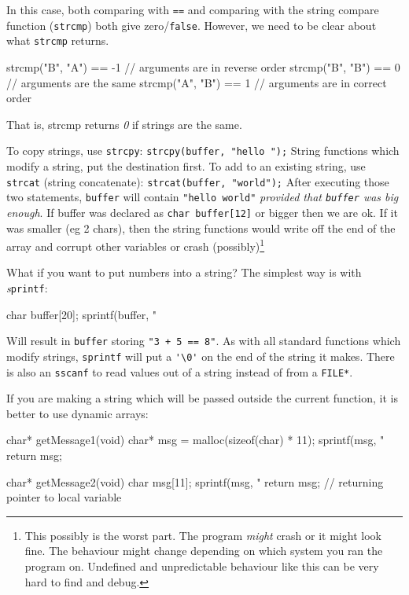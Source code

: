 In this case, both comparing with \texttt{==} and comparing with the string compare function (\texttt{strcmp}) both give zero/\lstinline!false!.
However, we need to be clear about what \texttt{strcmp} returns.
\begin{codeblock}
strcmp("B", "A") == -1 // arguments are in reverse order
strcmp("B", "B") == 0  // arguments are the same
strcmp("A", "B") == 1  // arguments are in correct order
\end{codeblock}
That is, strcmp returns \emph{0} if strings are the same.

To copy strings, use \texttt{strcpy}:
\lstinline{strcpy(buffer, "hello ");}
String functions which modify a string, put the destination first.
To add to an existing string, use \texttt{strcat} (string concatenate):
\lstinline{strcat(buffer, "world");}
After executing those two statements, \texttt{buffer} will contain \lstinline!"hello world"! \emph{provided that \texttt{buffer} was big enough}.
If buffer was declared as \lstinline!char buffer[12]! or bigger then we are ok.
If it was smaller (eg 2 chars), then the string functions would write off the end of the array and corrupt other variables or crash (possibly)\footnote{This possibly is the worst part.
The program \emph{might} crash or it might look fine.
The behaviour might change depending on which system you ran the program on.
Undefined and unpredictable behaviour like this can be very hard to find and debug.}

What if you want to put numbers into a string? 
The simplest way is with \emph{s}\texttt{printf}:
\begin{codeblock}
char buffer[20];
sprintf(buffer, "%
\end{codeblock}
Will result in \texttt{buffer} storing \lstinline!"3 + 5 == 8"!.
As with all standard functions which modify strings, \texttt{sprintf} will put a \lstinline!'\0'! on the end of the string it makes.
There is also an \texttt{sscanf} to read values out of a string instead of from a \texttt{FILE*}.

If you are making a string which will be passed outside the current function, it is better to use dynamic arrays:
\begin{codeblock}
char* getMessage1(void) {
    char* msg = malloc(sizeof(char) * 11);
    sprintf(msg, "%
    return msg;
}

char* getMessage2(void) {
    char msg[11];
    sprintf(msg, "%
    return msg;		// returning pointer to local variable
}
\end{codeblock}

